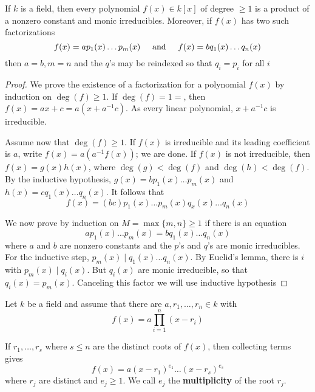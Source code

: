 \documentclass[11pt]{article}
\begin{document}
\begin{theorem}
If \(k\) is a field, then every polynomial \(f(x)\in k[x]\) of degree \(\ge1\) is
a product of a nonzero constant and monic irreducibles. Moreover, if \(f(x)\)
has two such factorizations
\begin{equation*}
f(x)=ap_1(x)\dots p_m(x)\hspace{0.5cm}\text{and}\hspace{0.5cm}
f(x)=bq_1(x)\dots q_n(x)
\end{equation*}
then \(a=b,m=n\) and the \(q\)'s may be reindexed so that \(q_i=p_i\) for all \(i\)
\end{theorem}

\begin{proof}
We prove the existence of a factorization for a polynomial \(f(x)\) by
induction on \(\deg(f)\ge1\). If \(\deg(f)=1=\), then \(f(x)=ax+c=a(x+a^{-1}c)\).
As every linear polynomial, \(x+a^{-1}c\) is irreducible.

Assume now that \(\deg(f)\ge1\). If \(f(x)\) is irreducible and its leading
coefficient is \(a\), write \(f(x)=a(a^{-1}f(x))\); we are done. If \(f(x)\) is not
irreducible, then \(f(x)=g(x)h(x)\), where \(\deg(g)<\deg(f)\) and
\(\deg(h)<\deg(f)\). By the inductive hypothesis, 
\(g(x)=bp_1(x)\dots p_m(x)\) and \(h(x)=cq_1(x)\dots q_n(x)\). It follows
that 
\begin{equation*}
f(x)=(bc)p_1(x)\dots p_m(x)q_x(x)\dots q_n(x)
\end{equation*}

We now prove by induction on \(M=\max\{m,n\}\ge1\) if there is an
equation
\begin{equation*}
ap_1(x)\dots p_m(x)=bq_1(x)\dots q_n(x)
\end{equation*}
where \(a\) and \(b\) are nonzero constants and the \(p\)'s and \(q\)'s are monic
irreducibles. For the inductive step, \(p_m(x)\mid q_1(x)\dots q_n(x)\). By
Euclid's lemma, there is \(i\) with \(p_m(x)\mid q_i(x)\). But \(q_i(x)\) are
monic irreducible, so that \(q_i(x)=p_m(x)\). Canceling this factor we will use
inductive hypothesis
\end{proof}

Let \(k\) be a field and assume that there are \(a,r_1,\dots,r_n\in k\) with
\begin{equation*}
f(x)=a \displaystyle\prod_{i=1}^n(x-r_i)
\end{equation*}

If \(r_1,\dots,r_s\) where \(s\le n\) are the distinct roots of \(f(x)\), then
collecting terms gives
\begin{equation*}
f(x)=a(x-r_1)^{e_1}\dots (x-r_s)^{e_s}
\end{equation*}
where \(r_j\) are distinct and \(e_j\ge1\). We call \(e_j\) the \textbf{multiplicity} of the
root \(r_j\). 
\end{document}
